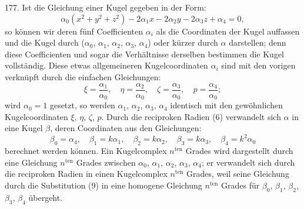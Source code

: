 177. Ist die Gleichung einer Kugel gegeben in der Form:
\[
  \alpha_0(x^2 + y^2 + z^2)
- 2\alpha_1 x - 2\alpha_2 y - 2\alpha_3 z + \alpha_4 = 0,
\]
so k\"onnen wir deren f\"unf Coefficienten $\alpha_i$ als die Coordinaten
der Kugel auf\/fassen und die Kugel durch
($\alpha_0$, $\alpha_1$, $\alpha_2$, $\alpha_3$, $\alpha_4$)
oder k\"urzer durch $\alpha$ darstellen; denn diese Coefficienten und
sogar die Verh\"altnisse derselben bestimmen die Kugel vollst\"andig.
Diese etwas allgemeineren Kugelcoordinaten $\alpha_i$ sind
mit den vorigen verkn\"upft durch die einfachen Gleichungen:
\[
\tag{8}
  \xi   = \frac{\alpha_1}{\alpha_0}, \quad
  \eta  = \frac{\alpha_2}{\alpha_0}, \quad
  \zeta = \frac{\alpha_3}{\alpha_0}, \quad
  p     = \frac{\alpha_4}{\alpha_0};
\]
wird $\alpha_0 = 1$ gesetzt, so werden
$\alpha_1$, $\alpha_2$, $\alpha_3$, $\alpha_4$
identisch mit
den gew\"ohnlichen Kugelcoordinaten
$\xi$, $\eta$, $\zeta$, $p$.
Durch die
reciproken Radien (6) verwandelt sich $\alpha$ in eine Kugel $\beta$,
deren Coordinaten aus den Gleichungen:
\[
\tag{9}
  \beta_0 =    \alpha_4, \quad
  \beta_1 = k  \alpha_1, \quad
  \beta_2 = k  \alpha_2, \quad
  \beta_3 = k  \alpha_3, \quad
  \beta_4 = k^2\alpha_0
\]
berechnet werden k\"onnen. Ein Kugelcomplex $n^{\text{ten}}$ Grades
wird dargestellt durch eine  Gleichung $n^{\text{ten}}$ Grades
zwischen $\alpha_0$, $\alpha_1$, $\alpha_2$, $\alpha_3$, $\alpha_4$; er verwandelt sich durch die
reciproken Radien in einen Kugelcomplex $n^{\text{ten}}$ Grades, weil
seine Gleichung durch die Substitution (9) in eine homogene
Gleichung $n^{\text{ten}}$ Grades f\"ur $\beta_0$, $\beta_1$, $\beta_2$, $\beta_3$,
$\beta_4$ \"ubergeht.

